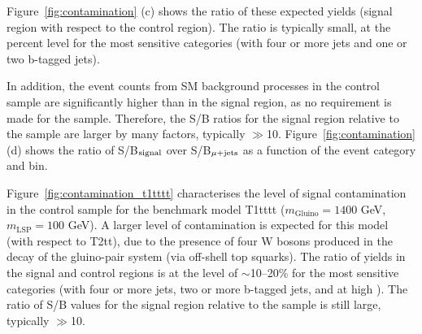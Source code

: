 Figure~\ref{fig:contamination} (c) shows the ratio of these expected
yields (signal region with respect to the \mj control region). The
ratio is typically small, at the percent level for the most sensitive
categories (\ie with four or more jets and one or two b-tagged jets).

In addition, the event counts from SM background processes in the \mj
control sample are significantly higher than in the signal region, as
no \alphat requirement is made for the \mj sample. Therefore, the S/B
ratios for the signal region relative to the \mj sample are larger by
many factors, typically $\gg$10. Figure~\ref{fig:contamination} (d)
shows the ratio of S/B$_{\rm signal}$ over S/B$_{\rm \mj}$ as a
function of the event category and \scalht bin.

Figure~\ref{fig:contamination_t1tttt} characterises the level of
signal contamination in the \mj control sample for the benchmark model
T1tttt ($m_{\mathrm{Gluino}}=1400$ GeV, $m_{\mathrm{LSP}}=100$ GeV). A larger level of contamination is
expected for this model (with respect to T2tt), due to the
presence of four W bosons produced in the decay of the gluino-pair
system (via off-shell top squarks). The ratio of yields in the signal
and \mj control regions is at the level of $\sim$10--20\% for the most
sensitive categories (\ie with four or more jets, two or more b-tagged
jets, and at high \scalht). The ratio of S/B values for the signal
region relative to the \mj sample is still large, typically $\gg$10.

